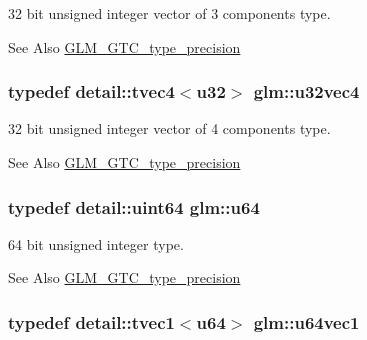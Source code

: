 32 bit unsigned integer vector of 3 components type. 

\begin{DoxySeeAlso}{See Also}
\hyperlink{group__gtc__type__precision}{G\-L\-M\-\_\-\-G\-T\-C\-\_\-type\-\_\-precision} 
\end{DoxySeeAlso}
\hypertarget{group__gtc__type__precision_ga5cd7923918307032d87d7d5ce0257c15}{
\subsubsection[{u32vec4}]{\setlength{\rightskip}{0pt plus 5cm}typedef detail\-::tvec4$<$u32$>$ {\bf glm\-::u32vec4}}}\label{group__gtc__type__precision_ga5cd7923918307032d87d7d5ce0257c15}


32 bit unsigned integer vector of 4 components type. 

\begin{DoxySeeAlso}{See Also}
\hyperlink{group__gtc__type__precision}{G\-L\-M\-\_\-\-G\-T\-C\-\_\-type\-\_\-precision} 
\end{DoxySeeAlso}
\hypertarget{group__gtc__type__precision_ga71cedd4972f9cb1a5e14dfe5ab83ecd7}{
\subsubsection[{u64}]{\setlength{\rightskip}{0pt plus 5cm}typedef detail\-::uint64 {\bf glm\-::u64}}}\label{group__gtc__type__precision_ga71cedd4972f9cb1a5e14dfe5ab83ecd7}


64 bit unsigned integer type. 

\begin{DoxySeeAlso}{See Also}
\hyperlink{group__gtc__type__precision}{G\-L\-M\-\_\-\-G\-T\-C\-\_\-type\-\_\-precision} 
\end{DoxySeeAlso}
\hypertarget{group__gtc__type__precision_ga8a4606421d8f5a874a21bc31346103cb}{
\subsubsection[{u64vec1}]{\setlength{\rightskip}{0pt plus 5cm}typedef detail\-::tvec1$<$u64$>$ {\bf glm\-::u64vec1}}}\label{group__gtc__type__precision_ga8a4606421d8f5a874a21bc31346103cb}


